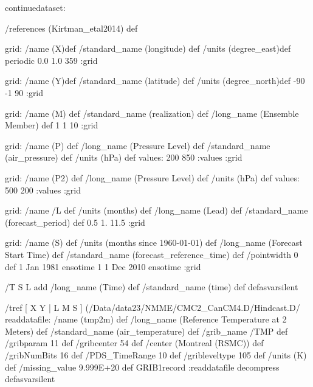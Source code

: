 \begin{ingrid}
continuedataset:

/references (Kirtman_etal2014) def

grid:
/name (X)def
/standard_name (longitude) def
/units (degree_east)def
periodic
 0.0 1.0 359
:grid

grid:
/name (Y)def
/standard_name (latitude) def
/units (degree_north)def
-90 -1 90
:grid

grid:
/name (M) def
/standard_name (realization) def
/long_name (Ensemble Member) def
1 1 10
:grid

grid:
/name (P) def
/long_name (Pressure Level) def
/standard_name (air_pressure) def
/units (hPa) def
values: 200 850 :values
:grid

grid:
/name (P2) def
/long_name (Pressure Level) def
/units (hPa) def
values: 500 200 :values
:grid


grid:
/name /L def
/units (months) def
/long_name (Lead) def
/standard_name (forecast_period) def
0.5 1. 11.5
:grid

grid:
/name (S) def
/units (months since 1960-01-01) def
/long_name (Forecast Start Time) def
/standard_name (forecast_reference_time) def
/pointwidth 0 def
1 Jan 1981 ensotime
1
1 Dec 2010 ensotime
:grid

%

/T { S L add
/long_name (Time) def
/standard_name (time) def } defasvarsilent

/tref {
[ X Y | L M S ] (/Data/data23/NMME/CMC2_CanCM4.D/Hindcast.D/%
readdatafile: 
/name (tmp2m) def
/long_name (Reference Temperature at 2 Meters) def
/standard_name (air_temperature) def
/grib_name /TMP def
/gribparam 11 def
/gribcenter 54 def
/center (Montreal (RSMC)) def
/gribNumBits 16 def
/PDS_TimeRange 10 def
/gribleveltype 105 def
/units (K) def
/missing_value 9.999E+20 def
GRIB1record
:readdatafile
decompress
} defasvarsilent


\end{ingrid}
